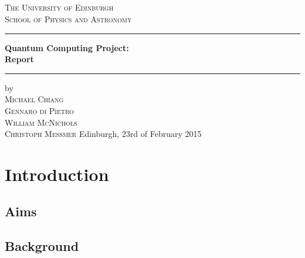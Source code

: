\documentclass[bibliography=totocnumbered]{article}
\title{
 \titlename\\
  \vspace{2cm}
  \vspace{1cm}
}
\author{\authorname}
\date{}
\theoremstyle{NoticeStyle}
\begin{document}
\newpage
\begin{titlepage}
	\centering
	{\LARGE \textsc{The University of Edinburgh}}\\[5pt]
	{\large \textsc{School of Physics and Astronomy}}\\
	\vspace{80pt}
	
	\rule{\linewidth}{1pt}
	{
	\textbf{\LARGE Quantum Computing Project:\\Report}
	}
	\rule{\linewidth}{1pt}
	
	\vspace{80pt}
	{\large
		
	}
	
	\vspace{200pt}
	{\large
	by\\
	\textsc{Michael Chiang\\
	Gennaro di Pietro\\
	William McNichols\\
	Christoph Meßmer}
	}
	\vfill
	{\large Edinburgh, 23rd of February 2015}
\end{titlepage}

\newpage


\tableofcontents
\newpage


%
\section{Introduction}

\subsection{Aims}

\subsection{Background}

\end{document}

